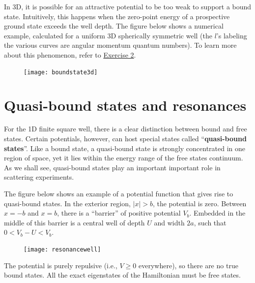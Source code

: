 \documentclass[pra,12pt]{revtex4}
\begin{document}
In 3D, it is possible for an attractive potential to be too weak to
support a bound state.  Intuitively, this happens when the zero-point
energy of a prospective ground state exceeds the well depth.  The
figure below shows a numerical example, calculated for a uniform 3D
spherically symmetric well (the $l$'s labeling the various curves are
angular momentum quantum numbers).  To learn more about this
phenomenon, refer to \hyperref[ex:boundstate3d]{Exercise 2}.

\vskip 0.15in
\begin{figure}[h]
  \centering\texttt{[image: boundstate3d]}
\end{figure}

\clearpage

\section{Quasi-bound states and resonances}
\label{sec:resonances}

For the 1D finite square well, there is a clear distinction between
bound and free states.  Certain potentials, however, can host special
states called ``\textbf{quasi-bound states}''.  Like a bound state, a
quasi-bound state is strongly concentrated in one region of space, yet
it lies within the energy range of the free states continuum.  As we
shall see, quasi-bound states play an important important role in
scattering experiments.

The figure below shows an example of a potential function that gives
rise to quasi-bound states.  In the exterior region, $|x| > b$, the
potential is zero.  Between $x = -b$ and $x = b$, there is a
``barrier'' of positive potential $V_b$.  Embedded in the middle of
this barrier is a central well of depth $U$ and width $2a$, such that
$0 < V_b - U < V_b$.

\begin{figure}[h]
  \centering\texttt{[image: resonancewell]}
\end{figure}

\noindent
The potential is purely repulsive (i.e., $V \ge 0$ everywhere), so
there are no true bound states.  All the exact eigenstates of the
Hamiltonian must be free states.
\end{document}
